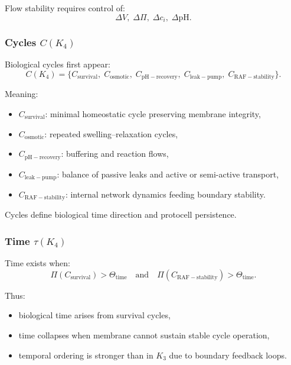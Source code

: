 Flow stability requires control of:
\[
\Delta V,\; \Delta \Pi,\; \Delta c_i,\; \Delta \mathrm{pH}.
\]

\subsubsection{Cycles \texorpdfstring{$C(K_4)$}{C(K_4)}}

Biological cycles first appear:
\[
C(K_4) =
\{ C_{\mathrm{survival}},\;
   C_{\mathrm{osmotic}},\;
   C_{\mathrm{pH-recovery}},\;
   C_{\mathrm{leak-pump}},\;
   C_{\mathrm{RAF-stability}} \}.
\]

Meaning:
\begin{itemize}
    \item $C_{\mathrm{survival}}$: minimal homeostatic cycle preserving
          membrane integrity,
    \item $C_{\mathrm{osmotic}}$: repeated swelling–relaxation cycles,
    \item $C_{\mathrm{pH-recovery}}$: buffering and reaction flows,
    \item $C_{\mathrm{leak-pump}}$: balance of passive leaks and active
          or semi-active transport,
    \item $C_{\mathrm{RAF-stability}}$: internal network dynamics feeding
          boundary stability.
\end{itemize}

Cycles define biological time direction and protocell persistence.

\subsubsection{Time \texorpdfstring{$\tau(K_4)$}{\tau(K_4)}}

Time exists when:
\[
\Pi(C_{\mathrm{survival}}) > \Theta_{\mathrm{time}}
\quad\text{and}\quad
\Pi(C_{\mathrm{RAF-stability}}) > \Theta_{\mathrm{time}}.
\]

Thus:
\begin{itemize}
    \item biological time arises from survival cycles,
    \item time collapses when membrane cannot sustain stable cycle
          operation,
    \item temporal ordering is stronger than in $K_3$ due to boundary
          feedback loops.
\end{itemize}

